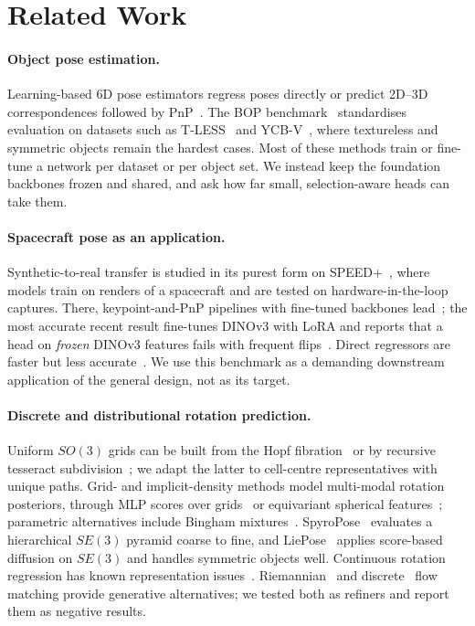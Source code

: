 \section{Related Work}
\label{sec:related}

\paragraph{Object pose estimation.}
Learning-based 6D pose estimators regress poses directly or predict 2D--3D correspondences followed by PnP~\cite{xiang2018posecnn}. The BOP benchmark~\cite{hodan2020bop} standardises evaluation on datasets such as T-LESS~\cite{hodan2017tless} and YCB-V~\cite{xiang2018posecnn}, where textureless and symmetric objects remain the hardest cases. Most of these methods train or fine-tune a network per dataset or per object set. We instead keep the foundation backbones frozen and shared, and ask how far small, selection-aware heads can take them.

\paragraph{Spacecraft pose as an application.}
Synthetic-to-real transfer is studied in its purest form on SPEED+~\cite{park2022speedplus}, where models train on renders of a spacecraft and are tested on hardware-in-the-loop captures. There, keypoint-and-PnP pipelines with fine-tuned backbones lead~\cite{park2024spnv2,park2023spec,ulmer2023eagernet,park2026spnv3}; the most accurate recent result fine-tunes DINOv3 with LoRA and reports that a head on \emph{frozen} DINOv3 features fails with frequent flips~\cite{church2026vfm}. Direct regressors are faster but less accurate~\cite{ancey2026fastpose,xie2026paidvit,dutta2026spacehop}. We use this benchmark as a demanding downstream application of the general design, not as its target.

\paragraph{Discrete and distributional rotation prediction.}
Uniform $SO(3)$ grids can be built from the Hopf fibration~\cite{yershova2010hopf} or by recursive tesseract subdivision~\cite{kurz2017tesseract}; we adapt the latter to cell-centre representatives with unique paths. Grid- and implicit-density methods model multi-modal rotation posteriors, through MLP scores over grids~\cite{murphy2021implicitpdf,hofer2023hyperposepdf} or equivariant spherical features~\cite{klee2023image2sphere}; parametric alternatives include Bingham mixtures~\cite{deng2022bingham}. SpyroPose~\cite{haugaard2023spyropose} evaluates a hierarchical $SE(3)$ pyramid coarse to fine, and LiePose~\cite{hsiao2024liepose} applies score-based diffusion on $SE(3)$ and handles symmetric objects well. Continuous rotation regression has known representation issues~\cite{zhou2019continuity}. Riemannian~\cite{chen2024rfm} and discrete~\cite{gat2024dfm} flow matching provide generative alternatives; we tested both as refiners and report them as negative results.

